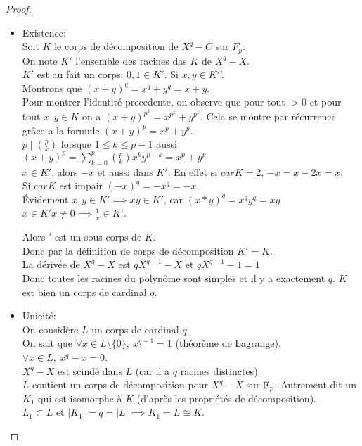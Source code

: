 \begin{proof}
	\begin{itemize}
		\item Existence:\\

		      Soit $K$ le corps de décomposition de $X^q-C$ sur $F_p$. \\
		      On note $K'$ l'ensemble des racines das $K$ de $X^q-X$. \\
		      $K'$ est au fait un corps: $0, 1 \in K'$. Si $x, y \in K'$'.\\
		      Montrons que $(x+y)^q = x^q + y^q = x+ y$.\\
		      Pour montrer l'identité precedente, on observe que pour tout $>0$ et pour tout $x,y \in K$ on a
		      $(x+y)^{p^k}= x^{p^k} + y^{p^k}$. Cela se montre par récurrence grâce a la formule $(x+y)^p= x^p + y^p$.\\
		      $p \mid \binom{p}{k}$ lorsque $1 \leq k \leq p-1$ aussi $(x+y)^p = \sum^p_{k=0} \binom{p}{k} x^k y^{p-k} = x^p + y^p$\\

		      $x\in K'$, alors $-x$ et aussi dans $K'$.
		      En effet si $car K = 2$, $-x = x -2x = x$. \\
		      Si $car K$ est impair $(-x)^q = -x^q = -x$. \\
		      Évidement $x,y \in K' \implies xy \in K'$, car $(x*y)^q = x^qy^q = xy$\\
		      $x\in K' x \neq 0 \implies \frac{1}{x} \in K'$.

		      Alors $'$ est un sous corps de $K$.\\
		      Donc par la définition de corps de décomposition $K' = K$.\\

		      La dérivée de $X^q-X$ est $qX^{q-1} - X$ et $qX^{q-1} - 1 = 1$\\
		      Donc toutes les racines du polynôme sont simples et il y a exactement $q$. $K$ est bien un corps de cardinal $q$.\\

		\item Unicité:\\

		      On considère $L$ un corps de cardinal $q$.\\
		      On sait que $\forall x \in L \setminus \{0\},\  x^{q-1} = 1$ (théorème de Lagrange).\\ %
		      $\forall x \in L, \ x^q -x = 0$.\\
		      $X^q-X$ est scindé dans $L$ (car il a $q$ racines distinctes).\\ %
		      $L$ contient un corps de décomposition pour $X^q-X$ sur $\mathbb{F}_p$. Autrement dit un $K_1$ qui est
		      isomorphe à $K$ (d'après les propriétés de décomposition).\\
		      $L_1 \subset L$ et $|K_1| = q = |L| \implies K_1 = L \cong K$.
	\end{itemize}
\end{proof}

